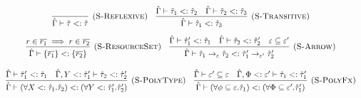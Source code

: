 \documentclass{llncs}
\begin{document}
\[
\begin{array}{c}


\infer[\textsc{(S-Reflexive)}]
	{\hat \Gamma \vdash \hat \tau <: \hat \tau}
	{}
~~~
\infer[\textsc{(S-Transitive)}]
	{\hat \Gamma \vdash \hat \tau_1 <: \hat \tau_3}
	{\hat \Gamma \vdash \hat \tau_1 <: \hat \tau_2 & \hat \Gamma \vdash \hat \tau_2 <: \hat \tau_3} \\[2ex]

\infer[\textsc{(S-ResourceSet)}]
	{\hat \Gamma \vdash \{ \overline{r_1} \} <: \{ \overline{r_2} \}}
	{r \in \overline{r_1} \implies r \in \overline{r_2}}
~~~
\infer[\textsc{(S-Arrow)}]
	{\hat \Gamma \vdash \hat \tau_1 \rightarrow_{\varepsilon} \hat \tau_2 <: \hat \tau_1' \rightarrow_{\varepsilon'} \hat \tau_2'}
	{\hat \Gamma \vdash \hat \tau_1' <: \hat \tau_1 & \hat \Gamma \vdash \hat \tau_2 <: \hat \tau_2' & \varepsilon \subseteq \varepsilon'} \\[3ex]

\infer[\textsc{(S-PolyType)}]
	{\hat \Gamma \vdash (\forall X <: \hat \tau_1 . \hat \tau_2) <: (\forall Y <: \hat \tau_1' . \hat \tau_2')}
	{\hat \Gamma \vdash \hat \tau_1' <: \hat \tau_1 & \hat \Gamma, Y <: \hat \tau_1' \vdash \hat \tau_2 <: \hat \tau_2'}
~~~
\infer[\textsc{(S-PolyFx)}]
	{\hat \Gamma \vdash (\forall \phi \subseteq \varepsilon. \hat \tau_1) <: (\forall \Phi \subseteq \varepsilon'. \hat \tau_1')}
	{\hat \Gamma \vdash \varepsilon' \subseteq \varepsilon & \hat \Gamma, \Phi <: \varepsilon' \vdash \hat \tau_1 <: \hat \tau_1'} \\[3ex]


\end{array}\]
\end{document}
